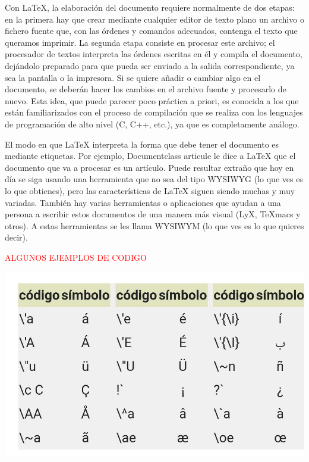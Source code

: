 \documentclass{article}
\begin{document}
\vspace{0.2cm}

Con LaTeX, la elaboración del documento requiere normalmente de dos etapas: en la primera hay que crear mediante cualquier editor de texto plano un archivo o fichero fuente que, con las órdenes y comandos adecuados, contenga el texto que queramos imprimir. La segunda etapa consiste en procesar este archivo; el procesador de textos interpreta las órdenes escritas en él y compila el documento, dejándolo preparado para que pueda ser enviado a la salida correspondiente, ya sea la pantalla o la impresora. Si se quiere añadir o cambiar algo en el documento, se deberán hacer los cambios en el archivo fuente y procesarlo de nuevo. Esta idea, que puede parecer poco práctica a priori, es conocida a los que están familiarizados con el proceso de compilación que se realiza con los lenguajes de programación de alto nivel (C, C++, etc.), ya que es completamente análogo.

\vspace{0.2cm}
El modo en que LaTeX interpreta la forma que debe tener el documento es mediante etiquetas. Por ejemplo, Documentclass {articule} le dice a LaTeX que el documento que va a procesar es un artículo. Puede resultar extraño que hoy en día se siga usando una herramienta que no sea del tipo  WYSIWYG (lo que ves es lo que obtienes), pero las características de LaTeX siguen siendo muchas y muy variadas. También hay varias herramientas o aplicaciones que ayudan a una persona a escribir estos documentos de una manera más visual (LyX, TeXmacs y otros). A estas herramientas se les llama WYSIWYM (lo que ves es lo que quieres decir).

\vspace{0.5cm}

\Large \textcolor{red}{ALGUNOS EJEMPLOS DE CODIGO}

\includegraphics[scale = 0.3]{codigouno.jpg.jpeg}
\end{document}
